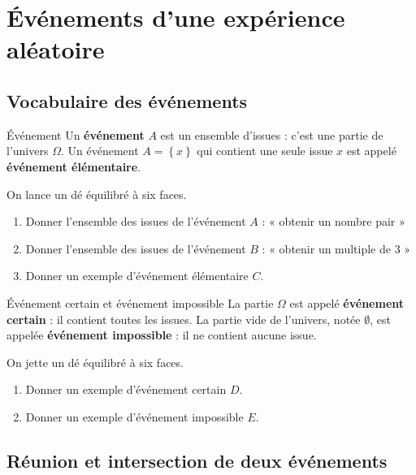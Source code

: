 \documentclass[11pt]{article}
\begin{document}
\section{Événements d'une expérience aléatoire}
\subsection{Vocabulaire des événements}

\begin{defi}{Événement}
  Un \textbf{événement} $A$ est un ensemble d'issues : c'est une partie de
  l'univers $\Omega$. Un événement $A=\left\{ x \right\}$ qui contient une seule
  issue $x$ est appelé \textbf{événement élémentaire}.
\end{defi}

\begin{app}
  On lance un dé équilibré à six faces.
  \begin{enumerate}
    \item Donner l'ensemble des issues de l'événement $A$ : « obtenir un nombre
      pair »
    \item Donner l'ensemble des issues de l'événement $B$ : « obtenir un
      multiple de $3$ »
    \item Donner un exemple d'événement élémentaire $C$.
  \end{enumerate}
\end{app}

\begin{defi}{Événement certain et événement impossible}
  La partie $\Omega$ est appelé \textbf{événement certain} : il contient toutes
  les issues. La partie vide de l'univers, notée $\emptyset$, est appelée
  \textbf{événement impossible} : il ne contient aucune issue.
\end{defi}

\begin{app}
  On jette un dé équilibré à six faces.
  \begin{enumerate}
    \item Donner un exemple d'événement certain $D$.
    \item Donner un exemple d'événement impossible $E$.
  \end{enumerate}
\end{app}

\subsection{Réunion et intersection de deux événements}
\end{document}
